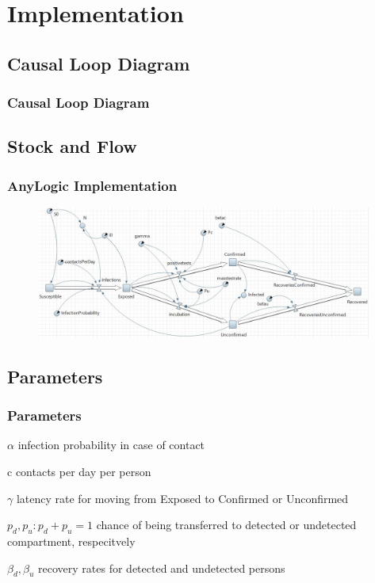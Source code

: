 \documentclass{beamer}
\begin{document}

\section{Implementation}
\subsection{Causal Loop Diagram}
\begin{frame}
\frametitle{Causal Loop Diagram}
  

\end{frame}


\subsection{Stock and Flow}
\begin{frame}
\frametitle{AnyLogic Implementation}

\begin{figure}[h!]
\includegraphics[width=110mm, scale = 0.5]{AnyLogicSIR}
\end{figure}
\end{frame}

\subsection{Parameters}
\begin{frame}
\frametitle{Parameters}
\begin{block}{$\alpha$}
  infection probability in case of contact
\end{block}

\begin{block}{c}
  contacts per day per person
\end{block}

\begin{block}{$\gamma$}
  latency rate for moving from Exposed to Confirmed or Unconfirmed
\end{block}

\begin{block}{$p_d, p_u: p_d + p_u = 1$}
  chance of being transferred to detected or undetected compartment, respecitvely
\end{block}

\begin{block}{$\beta_d, \beta_u$}
  recovery rates for detected and undetected persons
\end{block}
\end{frame}
\end{document}
